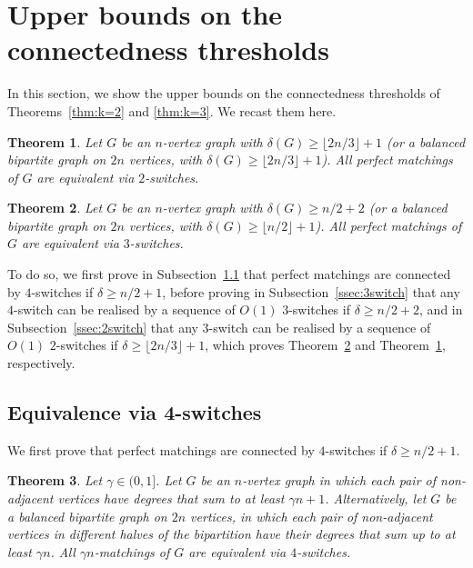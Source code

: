 \documentclass[11pt,a4paper]{article}
\newtheorem{theorem}{Theorem}[section]
\theoremstyle{definition}
\begin{document}
\section{Upper bounds on the connectedness thresholds} \label{sec:connectedness}
In this section, we show the upper bounds on the connectedness
thresholds of Theorems~\ref{thm:k=2} and \ref{thm:k=3}. We recast them here.

\begin{theorem}\label{thm:2SwitchMatching}
  Let $G$ be an $n$-vertex graph with $\delta(G) \ge \lfloor 2n/3 \rfloor+1$ (or a balanced
  bipartite graph on $2n$ vertices, with $\delta(G) \ge \lfloor 2n/3 \rfloor+1$). All perfect
  matchings of $G$ are equivalent via $2$-switches.
\end{theorem}

\begin{theorem}\label{thm:3SwitchMatching}
  Let $G$ be an $n$-vertex graph with $\delta(G) \ge n/2+2$ (or a balanced
  bipartite graph on $2n$ vertices, with $\delta(G) \ge \lfloor n/2\rfloor+1$). All perfect
  matchings of $G$ are equivalent via $3$-switches.
\end{theorem}

To do so, we first prove in Subsection~\ref{ssec:4switch} that perfect matchings are
connected by $4$-switches if $\delta \ge n/2+1$, before proving in
Subsection~\ref{ssec:3switch} that any $4$-switch can be realised by a sequence of $O(1)$
$3$-switches if $\delta \ge n/2+2$, and in Subsection~\ref{ssec:2switch} that any $3$-switch can be realised by a sequence of $O(1)$
$2$-switches if $\delta \ge \lfloor2n/3\rfloor+1$, which proves
Theorem~\ref{thm:3SwitchMatching} and Theorem~\ref{thm:2SwitchMatching}, respectively.

\subsection{Equivalence via 4-switches}\label{ssec:4switch}
We first prove that perfect matchings are connected by $4$-switches if $\delta
\ge n/2+1$.

\begin{theorem}\label{thm:4Switch}
  Let $\gamma \in (0,1]$. Let $G$ be an $n$-vertex graph in which each pair of
  non-adjacent vertices have degrees that sum to at least $\gamma n +
  1$. Alternatively, let $G$ be a balanced bipartite graph on $2n$ vertices, in
  which each pair of non-adjacent vertices in different halves of the bipartition
  have their degrees that sum up to at least $\gamma n$. All
  $\gamma n$-matchings of $G$ are equivalent via $4$-switches.
\end{theorem}
\end{document}
